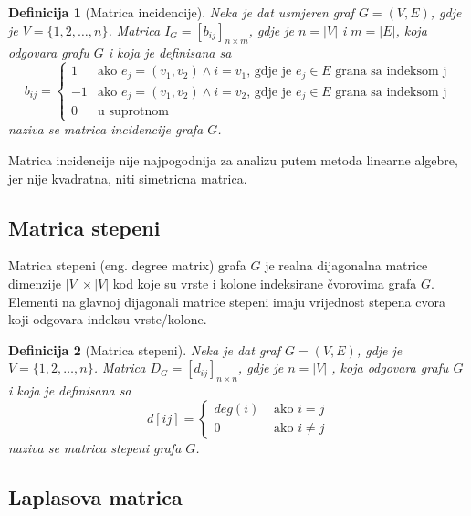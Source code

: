 \documentclass[11pt]{article}
\newtheorem{definition}{Definicija}
\begin{document}
			\begin{definition}[Matrica incidencije] 
			Neka je dat usmjeren graf $G = (V, E)$, gdje je $V = \{1, 2, \dots, n\}$. Matrica $I_G = [b_{ij}]_{n \times m}$, gdje je $n = |V|$ i $m = |E|$, koja odgovara grafu $G$ i koja je definisana sa
			 \[
				 b_{ij} =
				 \begin{cases}
				 1 & \text{ako } e_j = (v_1,v_2) \land i = v_1 \text{, gdje je } e_j \in E \text{ grana sa indeksom j} \\
				-1 & \text{ako } e_j = (v_1,v_2) \land i = v_2 \text{, gdje je } e_j \in E \text{ grana sa indeksom j} \\
				 0 & \text{u suprotnom}
				 \end{cases}
			 \]
			naziva se matrica incidencije grafa $G$.
			\end{definition}
	
	
			Matrica incidencije nije najpogodnija za analizu putem metoda linearne algebre, jer nije kvadratna, niti simetricna matrica.
	
		\subsection{Matrica stepeni}
		Matrica stepeni (eng. degree matrix) grafa $G$ je realna dijagonalna matrice dimenzije $|V| \times |V|$ kod koje su vrste i kolone indeksirane čvorovima grafa $G$.
		Elementi na glavnoj dijagonali matrice stepeni imaju vrijednost stepena cvora koji odgovara indeksu vrste/kolone. 
	
			\begin{definition}[Matrica stepeni] 
			Neka je dat graf $G = (V, E)$, gdje je $V = \{1, 2, \dots, n\}$. Matrica $D_G = [d_{ij}]_{n \times n}$, gdje je $n = |V|$ , koja odgovara grafu $G$ i koja je definisana sa
			\[
				d[ij] = 
				 \begin{cases}
				 deg(i) &  \text{ ako } i =j  \\ 
				 0  & \text{ ako } i \neq j 
				 \end{cases}
			\]
			naziva se matrica stepeni grafa $G$.
			\end{definition}
	
		\subsection{Laplasova matrica}
	
\end{document}
